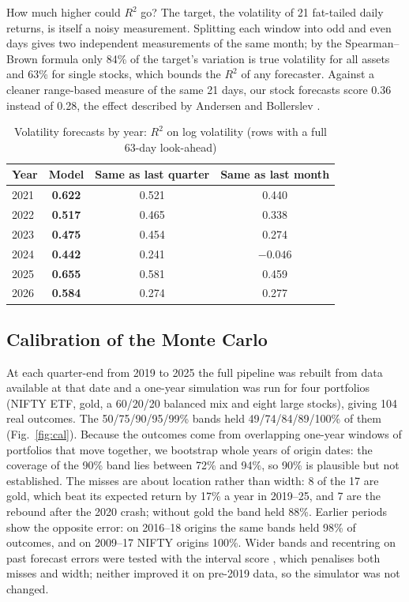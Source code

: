 \documentclass[conference]{IEEEtran}
\begin{document}
How much higher could $R^2$ go? The target, the volatility of 21 fat-tailed daily returns, is itself a noisy measurement. Splitting each window into odd and even days gives two independent measurements of the same month; by the Spearman--Brown formula only 84\% of the target's variation is true volatility for all assets and 63\% for single stocks, which bounds the $R^2$ of any forecaster. Against a cleaner range-based measure of the same 21 days, our stock forecasts score 0.36 instead of 0.28, the effect described by Andersen and Bollerslev \cite{andersen1998}.

\begin{table}[t]
\caption{Volatility forecasts by year: $R^2$ on log volatility (rows with a full 63-day look-ahead)}
\label{tab:vol}
\centering
\begin{tabular}{@{}lccc@{}}
\toprule
Year & Model & Same as last quarter & Same as last month \\
\midrule
2021 & \textbf{0.622} & 0.521 & 0.440 \\
2022 & \textbf{0.517} & 0.465 & 0.338 \\
2023 & \textbf{0.475} & 0.454 & 0.274 \\
2024 & \textbf{0.442} & 0.241 & $-0.046$ \\
2025 & \textbf{0.655} & 0.581 & 0.459 \\
2026 & \textbf{0.584} & 0.274 & 0.277 \\
\bottomrule
\end{tabular}
\end{table}

\subsection{Calibration of the Monte Carlo}
At each quarter-end from 2019 to 2025 the full pipeline was rebuilt from data available at that date and a one-year simulation was run for four portfolios (NIFTY ETF, gold, a 60/20/20 balanced mix and eight large stocks), giving 104 real outcomes. The 50/75/90/95/99\% bands held 49/74/84/89/100\% of them (Fig.~\ref{fig:cal}). Because the outcomes come from overlapping one-year windows of portfolios that move together, we bootstrap whole years of origin dates: the coverage of the 90\% band lies between 72\% and 94\%, so 90\% is plausible but not established. The misses are about location rather than width: 8 of the 17 are gold, which beat its expected return by 17\% a year in 2019--25, and 7 are the rebound after the 2020 crash; without gold the band held 88\%. Earlier periods show the opposite error: on 2016--18 origins the same bands held 98\% of outcomes, and on 2009--17 NIFTY origins 100\%. Wider bands and recentring on past forecast errors were tested with the interval score \cite{gneiting2007}, which penalises both misses and width; neither improved it on pre-2019 data, so the simulator was not changed.
\end{document}
